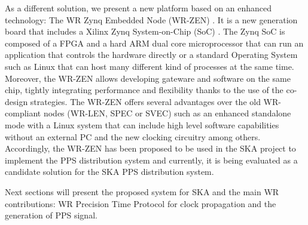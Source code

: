 As a different solution, we present a new platform based on an enhanced technology: The WR Zynq Embedded Node (WR-ZEN) \cite{sevensols:wr_zen}. It is a new generation board that includes a Xilinx Zynq System-on-Chip (SoC) \cite{xilinx:zynq}. The Zynq SoC is composed of a FPGA and a hard ARM dual core microprocessor that can run an application that controls the hardware directly or a standard Operating System such as Linux that can host many different kind of processes at the same time. Moreover, the WR-ZEN allows developing gateware and software on the same chip, tightly integrating performance and flexibility thanks to the use of the co-design strategies. The WR-ZEN offers several advantages over the old WR-compliant nodes (WR-LEN, SPEC or SVEC) such as an enhanced standalone mode with a Linux system that can include high level software capabilities without an external PC and the new clocking circuitry among others. Accordingly, the WR-ZEN has been proposed to be used in the SKA project to implement the PPS distribution system and currently, it is being evaluated as a candidate solution for the SKA PPS distribution system.  

Next sections will present the proposed system for SKA and the main WR contributions: WR Precision Time Protocol for clock propagation and the generation of PPS signal. 
